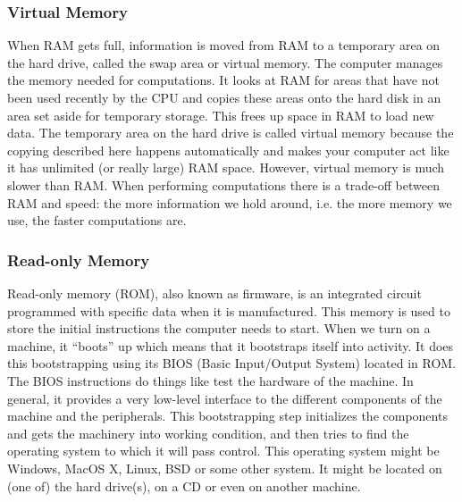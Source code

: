 \subsubsection{Virtual Memory}  
When RAM gets full, information is moved from RAM to a temporary area
on the hard drive, called the swap area or virtual memory.  The
computer manages the memory needed for computations.  It looks at RAM
for areas that have not been used recently by the CPU and copies these
areas onto the hard disk in an area set aside for temporary
storage. This frees up space in RAM to load new data. The temporary
area on the hard drive is called virtual memory because the copying
described here happens automatically and makes your computer act like
it has unlimited (or really large) RAM space. However, virtual memory
is much slower than RAM.  When performing computations there is a
trade-off between RAM and speed: the more information we hold around,
i.e. the more memory we use, the faster computations are.

\subsubsection{Read-only Memory} 
Read-only memory (ROM), also known as firmware, is an integrated
circuit programmed with specific data when it is manufactured.  This
memory is used to store the initial instructions the computer needs to
start. When we turn on a machine, it ``boots'' up which means that it
bootstraps itself into activity. It does this bootstrapping using its
BIOS (Basic Input/Output System) located in ROM.  The BIOS
instructions do things like test the hardware of the machine. In
general, it provides a very low-level interface to the different
components of the machine and the peripherals.  This bootstrapping
step initializes the components and gets the machinery into working
condition, and then tries to find the operating system to which it
will pass control.  This operating system might be Windows, MacOS X,
Linux, BSD or some other system.  It might be located on (one of) the
hard drive(s), on a CD or even on another machine.


